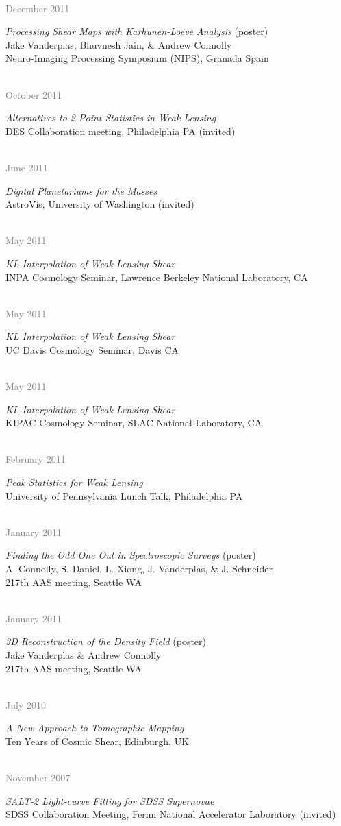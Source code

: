 \documentclass{article} %
\newlength\sidebarwidth
\newcommand{\dateonly}[2][]
	 {\begin{minipage}{\textwidth}
	 \vspace*{.4\baselineskip}
         \nopagebreak\hspace{0in}%
         \nopagebreak\begin{minipage}[t]{\sidebarwidth - .2cm}
         \raggedleft {~}
         {\\[-\baselineskip] \textcolor{gray}{\footnotesize #1}}
	 \end{minipage}%
	 \hfill
	 \begin{minipage}[t]{\linewidth - \sidebarwidth}
	 #2%
	 \end{minipage}%
	 \vspace*{.2\baselineskip plus 1\baselineskip minus
	 .2\baselineskip}%
	 \end{minipage}}
\begin{document}
  \dateonly[December 2011]{
    {\it Processing Shear Maps with Karhunen-Loeve Analysis} (poster)\\
    Jake Vanderplas, Bhuvnesh Jain, \& Andrew Connolly\\
    Neuro-Imaging Processing Symposium (NIPS), Granada Spain
  }
    
  \dateonly[October 2011]{
    {\it Alternatives to 2-Point Statistics in Weak Lensing}\\
    DES Collaboration meeting, Philadelphia PA (invited)
  }
    
  \dateonly[June 2011]{
    {\it Digital Planetariums for the Masses}\\
    AstroVis, University of Washington (invited)
  }
    
  \dateonly[May 2011]{
    {\it KL Interpolation of Weak Lensing Shear}\\
    INPA Cosmology Seminar, Lawrence Berkeley National Laboratory, CA
  }
    
  \dateonly[May 2011]{
    {\it KL Interpolation of Weak Lensing Shear}\\
    UC Davis Cosmology Seminar, Davis CA
  }
    
  \dateonly[May 2011]{
    {\it KL Interpolation of Weak Lensing Shear}\\
    KIPAC Cosmology Seminar, SLAC National Laboratory, CA
  }
    
  \dateonly[February 2011]{
    {\it Peak Statistics for Weak Lensing}\\
    University of Pennsylvania Lunch Talk, Philadelphia PA
  }
    
  \dateonly[January 2011]{
    {\it Finding the Odd One Out in Spectroscopic Surveys} (poster)\\
    A. Connolly, S. Daniel, L. Xiong, J. Vanderplas, \& J. Schneider\\
    217th AAS meeting, Seattle WA
  }

  \dateonly[January 2011]{
    {\it 3D Reconstruction of the Density Field} (poster)\\
    Jake Vanderplas \& Andrew Connolly\\
    217th AAS meeting, Seattle WA
  }
    
  \dateonly[July 2010]{
    {\it A New Approach to Tomographic Mapping}\\
    Ten Years of Cosmic Shear, Edinburgh, UK
  }

  \dateonly[November 2007]{
    {\it SALT-2 Light-curve Fitting for SDSS Supernovae}\\
    SDSS Collaboration Meeting, Fermi National Accelerator Laboratory (invited)
  }
\end{document}
